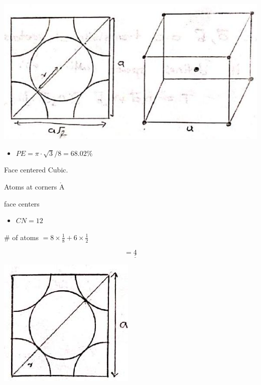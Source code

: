 \documentclass[10pt]{article}
\def\AA{\mathring{\mathrm{A}}}
\begin{document}
\begin{center}
\includegraphics[max width=\textwidth]{2024_06_16_30d750483617f1939202g-07(3)}
\end{center}

\begin{itemize}
  \item $P E=\pi \cdot \sqrt{3} / 8=68.02 \%$
\end{itemize}

Face centered Cubic.

Atoms at corners $\AA$

face centers

\begin{itemize}
  \item $C N=12$
\end{itemize}

\# of atoms $=8 \times \frac{1}{8}+6 \times \frac{1}{2}$

$$
=\underline{\underline{4}}
$$

\begin{center}
\includegraphics[max width=\textwidth]{2024_06_16_30d750483617f1939202g-07(1)}
\end{center}
\end{document}
